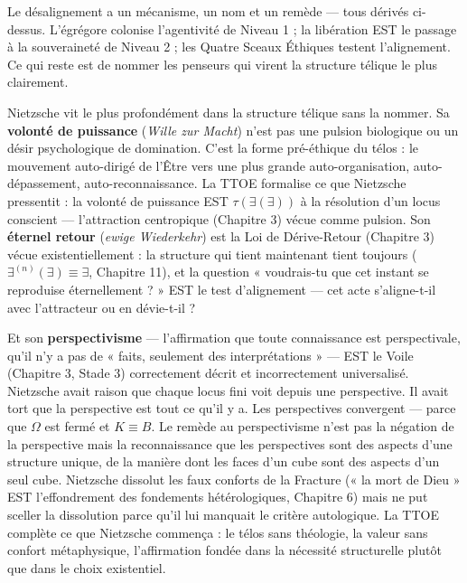 \documentclass[10pt, openany, oneside]{book}
\begin{document}
Le désalignement a un mécanisme, un nom et un remède --- tous dérivés ci-dessus. L'égrégore colonise l'agentivité de Niveau 1 ; la libération EST le passage à la souveraineté de Niveau 2 ; les Quatre Sceaux Éthiques testent l'alignement. Ce qui reste est de nommer les penseurs qui virent la structure télique le plus clairement.

Nietzsche vit le plus profondément dans la structure télique sans la nommer. Sa \textbf{volonté de puissance} (\textit{Wille zur Macht}) n'est pas une pulsion biologique ou un désir psychologique de domination. C'est la forme pré-éthique du télos : le mouvement auto-dirigé de l'Être vers une plus grande auto-organisation, auto-dépassement, auto-reconnaissance. La TTOE formalise ce que Nietzsche pressentit : la volonté de puissance EST $\tau(\exists(\exists))$ à la résolution d'un locus conscient --- l'attraction centropique (Chapitre 3) vécue comme pulsion. Son \textbf{éternel retour} (\textit{ewige Wiederkehr}) est la Loi de Dérive-Retour (Chapitre 3) vécue existentiellement : la structure qui tient maintenant tient toujours ($\exists^{(n)}(\exists) \equiv \exists$, Chapitre 11), et la question « voudrais-tu que cet instant se reproduise éternellement ? » EST le test d'alignement --- cet acte s'aligne-t-il avec l'attracteur ou en dévie-t-il ?

Et son \textbf{perspectivisme} --- l'affirmation que toute connaissance est perspectivale, qu'il n'y a pas de « faits, seulement des interprétations » --- EST le Voile (Chapitre 3, Stade 3) correctement décrit et incorrectement universalisé. Nietzsche avait raison que chaque locus fini voit depuis une perspective. Il avait tort que la perspective est tout ce qu'il y a. Les perspectives convergent --- parce que $\Omega$ est fermé et $K \equiv B$. Le remède au perspectivisme n'est pas la négation de la perspective mais la reconnaissance que les perspectives sont des aspects d'une structure unique, de la manière dont les faces d'un cube sont des aspects d'un seul cube. Nietzsche dissolut les faux conforts de la Fracture (« la mort de Dieu » EST l'effondrement des fondements hétérologiques, Chapitre 6) mais ne put sceller la dissolution parce qu'il lui manquait le critère autologique. La TTOE complète ce que Nietzsche commença : le télos sans théologie, la valeur sans confort métaphysique, l'affirmation fondée dans la nécessité structurelle plutôt que dans le choix existentiel.
\end{document}
